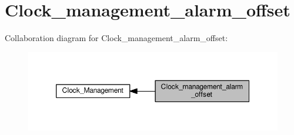 \hypertarget{group___clock__management__alarm__offset}{}\section{Clock\+\_\+management\+\_\+alarm\+\_\+offset}
\label{group___clock__management__alarm__offset}
Collaboration diagram for Clock\+\_\+management\+\_\+alarm\+\_\+offset\+:\nopagebreak
\begin{figure}[H]
\begin{center}
\leavevmode
\includegraphics[width=350pt]{de/dc7/group___clock__management__alarm__offset}
\end{center}
\end{figure}
